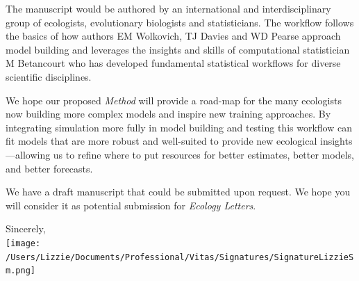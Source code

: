 \documentclass[11pt]{article}
\begin{document}

The manuscript would be authored by an international and interdisciplinary group of ecologists, evolutionary biologists and statisticians. The workflow follows the basics of how authors EM Wolkovich, TJ Davies and WD Pearse approach model building and leverages the insights and skills of computational statistician M Betancourt who has developed fundamental statistical workflows for diverse scientific disciplines. 

We hope our proposed \emph{Method} will provide a road-map for the many ecologists now building more complex models and inspire new training approaches. By integrating simulation more fully in model building and testing this workflow can fit models that are more robust and well-suited to provide new ecological insights---allowing us to refine where to put resources for better estimates, better models, and better forecasts. 

We have a draft manuscript that could be submitted upon request. We hope you will consider it as potential submission for \emph{Ecology Letters}. 

Sincerely,\\

\texttt{[image: /Users/Lizzie/Documents/Professional/Vitas/Signatures/SignatureLizzieSm.png]} \\
\end{document}

